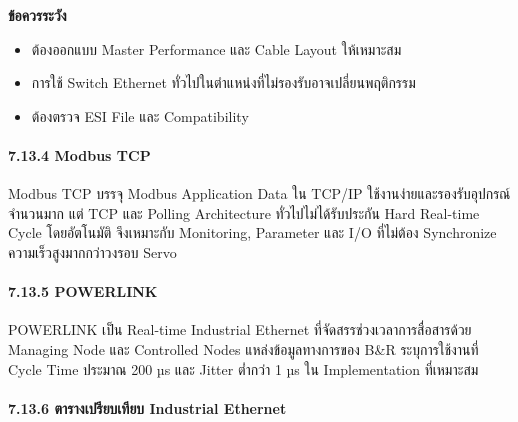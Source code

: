 \textbf{ข้อควรระวัง}

\begin{itemize}
    \item ต้องออกแบบ Master Performance และ Cable Layout ให้เหมาะสม
    \item การใช้ Switch Ethernet ทั่วไปในตำแหน่งที่ไม่รองรับอาจเปลี่ยนพฤติกรรม
    \item ต้องตรวจ ESI File และ Compatibility
\end{itemize}

\paragraph{7.13.4 Modbus TCP}

Modbus TCP บรรจุ Modbus Application Data ใน TCP/IP ใช้งานง่ายและรองรับอุปกรณ์จำนวนมาก แต่ TCP และ Polling Architecture ทั่วไปไม่ได้รับประกัน Hard Real-time Cycle โดยอัตโนมัติ จึงเหมาะกับ Monitoring, Parameter และ I/O ที่ไม่ต้อง Synchronize ความเร็วสูงมากกว่าวงรอบ Servo

\paragraph{7.13.5 POWERLINK}

POWERLINK เป็น Real-time Industrial Ethernet ที่จัดสรรช่วงเวลาการสื่อสารด้วย Managing Node และ Controlled Nodes แหล่งข้อมูลทางการของ B\&R ระบุการใช้งานที่ Cycle Time ประมาณ 200 µs และ Jitter ต่ำกว่า 1 µs ใน Implementation ที่เหมาะสม

\paragraph{7.13.6 ตารางเปรียบเทียบ Industrial Ethernet}

